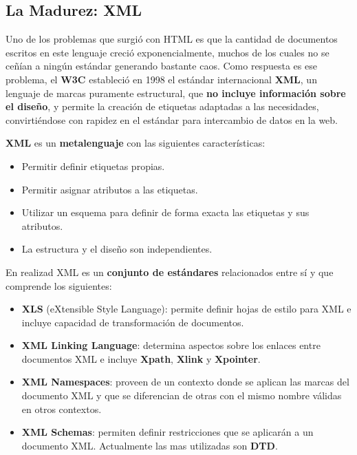 \subsection{La Madurez: XML}
Uno de los problemas que surgió con HTML es que la cantidad de documentos escritos en este lenguaje creció exponencialmente, muchos de los cuales no se ceñían a ningún estándar generando bastante caos. Como respuesta es ese problema, el \textbf{\gls{W3C}} estableció en 1998 el estándar internacional \textbf{\gls{XML}}, un lenguaje de marcas puramente estructural, que \textbf{no incluye información sobre el diseño}, y permite la creación de etiquetas adaptadas a las necesidades, convirtiéndose con rapidez en el estándar para intercambio de datos en la web.

\textbf{XML} es un \textbf{\gls{metalenguaje}} con las siguientes características:

\begin{itemize}
    \item Permitir definir etiquetas propias.
    \item Permitir asignar atributos a las etiquetas.
    \item Utilizar un esquema para definir de forma exacta las etiquetas y sus atributos.
    \item La estructura y el diseño son independientes.
\end{itemize}

En realizad XML es un \textbf{conjunto de estándares} relacionados entre sí y que comprende los siguientes:

\begin{itemize}
    \item \textbf{XLS} (eXtensible Style Language): permite definir hojas de estilo para XML e incluye capacidad de transformación de documentos.
    \item \textbf{XML Linking Language}: determina aspectos sobre los enlaces entre documentos XML e incluye \textbf{Xpath}, \textbf{Xlink} y \textbf{Xpointer}.
    \item \textbf{XML Namespaces}: proveen de un contexto donde se aplican las marcas del documento XML y que se diferencian de otras con el mismo nombre válidas en otros contextos.
    \item \textbf{XML Schemas}: permiten definir restricciones que se aplicarán a un documento XML. Actualmente las mas utilizadas son \textbf{DTD}.
\end{itemize}



